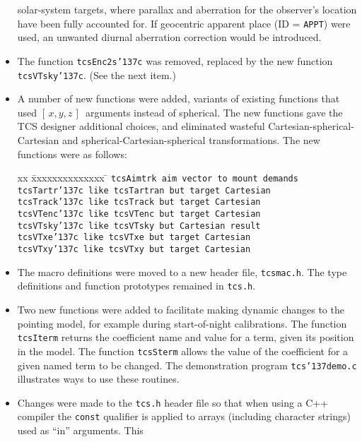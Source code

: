 \documentclass[12pt,fleqn,twoside]{article}
\renewcommand{\_}{{\tt\char'137}}     %
\newcommand{\xyz}       {$[\,x,y,z\,]$}
\begin{document}
\begin{itemize}
      solar-system targets, where parallax and aberration for the
      observer's location have been fully accounted for.  If geocentric
      apparent place (ID = {\tt APPT}) were used, an unwanted
      diurnal aberration correction would be introduced.
\item The function {\tt tcsEnc2s\_c} was removed, replaced by
      the new function
      {\tt tcsVTsky\_c}.  (See the next item.)
\item A number of new functions were added, variants of existing
      functions that used \xyz\ arguments instead of spherical.  The
      new functions
      gave the TCS designer additional choices, and eliminated
      wasteful Cartesian-spherical-Cartesian and
      spherical-Cartesian-spherical transformations.  The new functions
      were as follows:
\begin{tabbing}
xx \= xxxxxxxxxxxxxx \= \kill
\> \tt tcsAimtrk   \> aim vector to mount demands \\
\> \tt tcsTartr\_c \> like {\tt tcsTartran} but target Cartesian \\
\> \tt tcsTrack\_c \> like {\tt tcsTrack} but target Cartesian \\
\> \tt tcsVTenc\_c \> like {\tt tcsVTenc} but target Cartesian \\
\> \tt tcsVTsky\_c \> like {\tt tcsVTsky} but Cartesian result \\
\> \tt tcsVTxe\_c  \> like {\tt tcsVTxe} but target Cartesian \\
\> \tt tcsVTxy\_c  \> like {\tt tcsVTxy} but target Cartesian
\end{tabbing}
\item The macro definitions were moved to a new header file,
      {\tt tcsmac.h}.  The type definitions and function
      prototypes remained in {\tt tcs.h}.
\item Two new functions were added to facilitate making dynamic
      changes to the pointing model, for example during start-of-night
      calibrations.  The function {\tt tcsIterm} returns the
      coefficient name and value for a term, given its position in
      the model.  The function {\tt tcsSterm} allows the value of the
      coefficient for a given named term to be changed.  The demonstration
      program {\tt tcs\_demo.c} illustrates ways to use these routines.
\item Changes were made to the {\tt tcs.h} header file so that when
      using a C++ compiler the {\tt const} qualifier is applied to arrays
      (including character strings) used as ``in'' arguments.  This

\end{itemize}
\end{document}
